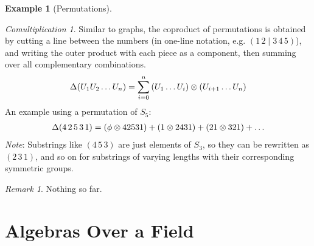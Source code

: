 \documentclass{article}
\theoremstyle{definition}
\newtheorem{Example}{Example}
\theoremstyle{remark}
\newtheorem*{Remark*}{Remark}
\theoremstyle{underline}
\theoremstyle{underline}
\newtheorem*{Comultiplication*}{Comultiplication}
\begin{document}
\begin{Example}[Permutations]
\begin{Comultiplication*}
Similar to graphs, the coproduct of permutations is obtained by cutting a line between the numbers (in one-line notation, e.g. $(1 \, 2 \mid 3\, 4\, 5)$), and writing the outer product with each piece as a component, then summing over all complementary combinations. 
\begin{gather}
	\Delta\pqty{U_1 U_2 \ldots U_n} = \sum_{i=0}^n \pqty{U_1\ldots U_i} \otimes \pqty{U_{i+1}\ldots U_n}
\end{gather}
An example using a permutation of $S_5$:
\begin{gather}
	\Delta\pqty{4 \, 2 \, 5 \, 3 \, 1} = \pqty{\phi \otimes 42531} + \pqty{1 \otimes 2431} + \pqty{21 \otimes 321} + \ldots
\end{gather}
\emph{Note}: Substrings like $(4 \, 5 \, 3)$ are just elements of $S_3$, so they can be rewritten as $(2 \, 3 \, 1)$, and so on for substrings of varying lengths with their corresponding symmetric groups. 
\end{Comultiplication*}

\begin{Remark*}
Nothing so far.
\end{Remark*}
\end{Example}

\section{Algebras Over a Field}
\end{document}
